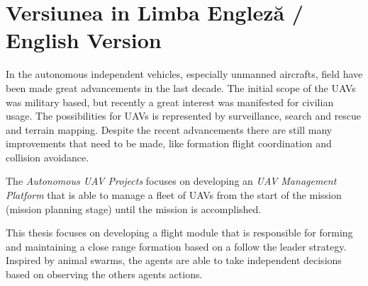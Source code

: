 
\section{Versiunea in Limba Engleză / English Version}

In the autonomous independent vehicles, especially unmanned aircrafts, field
have been made great advancements in the last decade. The initial scope of
the UAVs was military based, but recently a great interest was manifested
for civilian usage. The possibilities for UAVs is represented by surveillance, 
search and rescue and terrain mapping. Despite the recent advancements there
are still many improvements that need to be made, like formation flight coordination
and collision avoidance.

The \textit{Autonomous UAV Projects} focuses on developing an \textit{UAV 
Management Platform} that is able to manage a fleet of UAVs from the start of 
the mission (mission planning stage) until the mission is accomplished.

This thesis focuses on developing a flight module that is responsible
for forming and maintaining a close range formation based on a follow the leader
strategy. Inspired by animal swarms, the agents are able to take independent
decisions based on observing the others agents actions.

